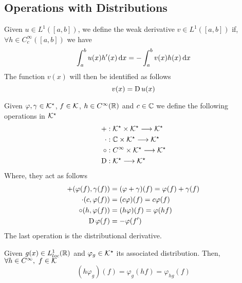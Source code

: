 \documentclass[../complete.tex]{subfiles}
\begin{document}
\subsection{Operations with Distributions}
\begin{dfn}
	Given $u\in L^1([a,b])$, we define the weak derivative $v\in L^1([a,b])$ if, $\forall h\in C_c^\infty([a,b])$ we have
	\begin{equation*}
		\int_{a}^{b}u(x)h'(x)\operatorname{d\!} x=-\int_{a}^{b}v(x)h(x)\operatorname{d\!} x
	\end{equation*}
	The function $v(x)$ will then be identified as follows
	\begin{equation*}
		v(x)=\operatorname{\mathrm{D}} u(x)
	\end{equation*}
\end{dfn}
\begin{thm}
	Given $\varphi,\gamma\in\mathcal{K}^\star$, $f\in\mathcal{K}$, $h\in C^\infty(\mathbb{R})$ and $c\in\mathbb{C}$ we define the following operations in $\mathcal{K}^\star$
	\begin{equation}
		\begin{aligned}
			+&:\mathcal{K}^\star\times\mathcal{K}^\star\overset{}{\longrightarrow}\mathcal{K}^\star\\
			\cdot&:\mathbb{C}\times\mathcal{K}^\star\overset{}{\longrightarrow}\mathcal{K}^\star\\
			\circ&:C^\infty\times\mathcal{K}^\star\overset{}{\longrightarrow}\mathcal{K}^\star\\
			\operatorname{\mathrm{D}}&:\mathcal{K}^\star\overset{}{\longrightarrow}\mathcal{K}^\star
		\end{aligned}
		\label{eq:operationsdef}
	\end{equation}
	Where, they act as follows
	\begin{equation*}
		\begin{aligned}
			+(\varphi(f),\gamma(f))&=(\varphi+\gamma)(f)=\varphi(f)+\gamma(f)\\
			\cdot(c,\varphi(f))&=(c\varphi)(f)=c\varphi(f)\\
			\circ(h,\varphi(f))&=(h\varphi)(f)=\varphi(hf)\\
			\operatorname{\mathrm{D}}\varphi(f)&=-\varphi(f')
		\end{aligned}
	\end{equation*}
	The last operation is the distributional derivative.\\
\end{thm}
\begin{thm}
	Given $g(x)\in L^1_{loc}(\mathbb{R})$ and $\varphi_g\in\mathcal{K}^\star$ its associated distribution. Then, $\forall h\in C^\infty,\ f\in\K$
	\begin{equation}
		(h\varphi_g)(f)=\varphi_g(hf)=\varphi_{hg}(f)
		\label{eq:cinftyprod}
	\end{equation}
\end{thm}
\end{document}
